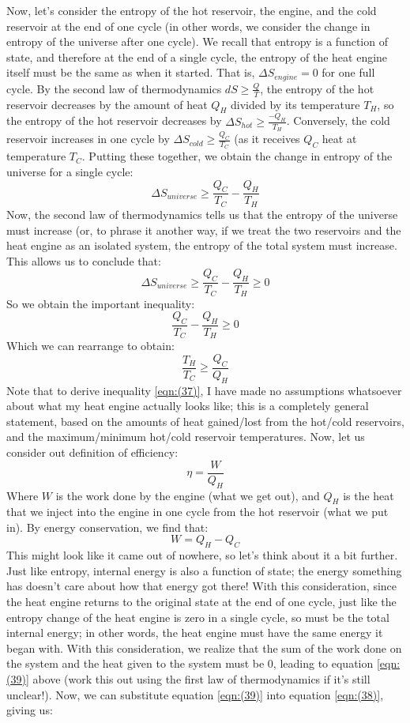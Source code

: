 Now, let's consider the entropy of the hot reservoir, the engine, and the cold reservoir at the end of one cycle (in other words, we consider the change in entropy of the universe after one cycle). We recall that entropy is a function of state, and therefore at the end of a single cycle, the entropy of the heat engine itself must be the same as when it started. That is, $\Delta S_{engine} = 0$ for one full cycle. By the second law of thermodynamics $dS \geq \frac{Q}{T}$, the entropy of the hot reservoir decreases by the amount of heat $Q_H$ divided by its temperature $T_H$, so the entropy of the hot reservoir decreases by $\Delta S_{hot} \geq \frac{-Q_H}{T_H}$. Conversely, the cold reservoir increases in one cycle by $\Delta S_{cold} \geq \frac{Q_C}{T_C}$ (as it receives $Q_C$ heat at temperature $T_C$. Putting these together, we obtain the change in entropy of the universe for a single cycle:
\[\Delta S_{universe} \geq \frac{Q_C}{T_C} - \frac{Q_H}{T_H} \]
Now, the second law of thermodynamics tells us that the entropy of the universe must increase (or, to phrase it another way, if we treat the two reservoirs and the heat engine as an isolated system, the entropy of the total system must increase. This allows us to conclude that:
\[\Delta S_{universe} \geq \frac{Q_C}{T_C} - \frac{Q_H}{T_H} \geq 0 \]
So we obtain the important inequality:
\[\frac{Q_C}{T_C} - \frac{Q_H}{T_H} \geq 0 \]
Which we can rearrange to obtain:
\begin{equation}
    \label{eqn:(37)}
    \frac{T_H}{T_C} \geq \frac{Q_C}{Q_H}
\end{equation}
Note that to derive inequality \ref{eqn:(37)}, I have made no assumptions whatsoever about what my heat engine actually looks like; this is a completely general statement, based on the amounts of heat gained/lost from the hot/cold reservoirs, and the maximum/minimum hot/cold reservoir temperatures. Now, let us consider out definition of efficiency:
\begin{equation}
    \label{eqn:(38)}
    \eta = \frac{W}{Q_H}
\end{equation}
Where $W$ is the work done by the engine (what we get out), and $Q_H$ is the heat that we inject into the engine in one cycle from the hot reservoir (what we put in). By energy conservation, we find that:
\begin{equation}
    \label{eqn:(39)}
    W = Q_H-Q_C
\end{equation}
This might look like it came out of nowhere, so let's think about it a bit further. Just like entropy, internal energy is also a function of state; the energy something has doesn't care about how that energy got there! With this consideration, since the heat engine returns to the original state at the end of one cycle, just like the entropy change of the heat engine is zero in a single cycle, so must be the total internal energy; in other words, the heat engine must have the same energy it began with. With this consideration, we realize that the sum of the work done on the system and the heat given to the system must be 0, leading to equation \ref{eqn:(39)} above (work this out using the first law of thermodynamics if it's still unclear!). Now, we can substitute equation \ref{eqn:(39)} into equation \ref{eqn:(38)}, giving us:
